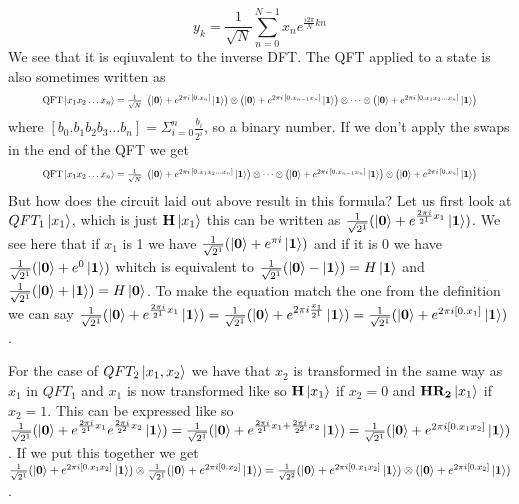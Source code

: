 $$y_{k}={\frac {1}{\sqrt {N}}}\sum _{n=0}^{N-1}x_{n}e^{{\frac {i2\pi }{N}}kn}$$
We see that it is eqiuvalent to the inverse DFT.
The QFT applied to a state is also sometimes written as 
\begin{equation*}
\resizebox{.9\hsize}{!}{${\text{QFT}}\ket{x_{1}x_{2}\ldots x_{n}} ={\frac {1}{\sqrt {N}}}\ \left(\ket{\qtz} +e^{2\pi i\,[0.x_{n}]}\ket{\qto} \right)\otimes \left(\ket{\qtz} +e^{2\pi i\,[0.x_{n-1}x_{n}]}\ket{\qto} \right)\otimes \cdots \otimes \left(\ket{\qtz} +e^{2\pi i\,[0.x_{1}x_{2}\ldots x_{n}]}\ket{\qto} \right)$}
\end{equation*}
where $[b_0.b_1b_2b_3...b_n]=\Sigma^{n}_{i=0}\frac{b_i}{2^i}$, so a binary number\cite{osd}. If we don't apply the swaps in the end of the QFT we get 
\begin{equation*}
    \resizebox{.9\hsize}{!}{${\text{QFT}}\ket{x_{1}x_{2}\ldots x_{n}}={\frac {1}{\sqrt {N}}}\ \left(\ket{\qtz} +e^{2\pi i\,[0.x_{1}x_{2}\ldots x_{n}]}\ket{\qto} \right)\otimes \cdots \otimes \left(\ket{\qtz} +e^{2\pi i\,[0.x_{n-1}x_{n}]}\ket{\qto} \right)\otimes \left(\ket{\qtz} +e^{2\pi i\,[0.x_{n}]}\ket{\qto} \right)$}
\end{equation*}
But how does the circuit laid out above result in this formula?
Let us first look at $QFT_1\ket{x_1}$, which is just $\mathbf{H}\ket{x_1}$ this can be written as $\frac{1}{\sqrt{2^1}}(\ket{\mathbf{0}}+e^{\frac{2\pi i}{2^1}x_1}\ket{\mathbf{1}})$.
We see here that if $x_1$ is 1 we have $\frac{1}{\sqrt{2^1}}(\ket{\mathbf{0}}+e^{\pi i}\ket{\mathbf{1}})$ and if it is 0 we have $\frac{1}{\sqrt{2^1}}(\ket{\mathbf{0}}+e^{0}\ket{\mathbf{1}})$ whitch is equivalent to $\frac{1}{\sqrt{2^1}}(\ket{\mathbf{0}}-\ket{\mathbf{1}})=H\ket{\mathbf{1}}$ and $\frac{1}{\sqrt{2^1}}(\ket{\mathbf{0}}+\ket{\mathbf{1}})=H\ket{\mathbf{0}}$. 
To make the equation match the one from the definition we can say $\frac{1}{\sqrt{2^1}}(\ket{\mathbf{0}}+e^{\frac{2\pi i}{2^1}x_1}\ket{\mathbf{1}})=\frac{1}{\sqrt{2^1}}(\ket{\mathbf{0}}+e^{2\pi i\frac{x_1}{2^1}}\ket{\mathbf{1}})=\frac{1}{\sqrt{2^1}}(\ket{\mathbf{0}}+e^{2\pi i[0.x_1]}\ket{\mathbf{1}})$. 


For the case of $QFT_2\ket{x_1,x_2}$ we have that $x_2$ is transformed in the same way as $x_1$ in $QFT_1$ and $x_1$ is now transformed like so $\mathbf{H}\ket{x_1}$ if $x_2=0$ and $\mathbf{H}\mathbf{R_{2}}\ket{x_1}$ if $x_2=1$. 
This can be expressed like so 
$\frac{1}{\sqrt{2^1}}(\ket{\mathbf{0}}+e^{\frac{2\pi i}{2^1}x_1}e^{\frac{2\pi i}{2^2}x_2}\ket{\mathbf{1}})= \frac{1}{\sqrt{2^1}}(\ket{\mathbf{0}}+e^{\frac{2\pi i}{2^1}x_1+\frac{2\pi i}{2^2}x_2}\ket{\mathbf{1}})=\frac{1}{\sqrt{2^1}}(\ket{\mathbf{0}}+e^{2\pi i[0.x_1x_2]}\ket{\mathbf{1}})$. 
If we put this together we get $\frac{1}{\sqrt{2^1}}(\ket{\mathbf{0}}+e^{2\pi i[0.x_1x_2]}\ket{\mathbf{1}})\otimes \frac{1}{\sqrt{2^1}}(\ket{\mathbf{0}}+e^{2\pi i[0.x_2]}\ket{\mathbf{1}})=\frac{1}{\sqrt{2^2}}(\ket{\mathbf{0}}+e^{2\pi i[0.x_1x_2]}\ket{\mathbf{1}})\otimes(\ket{\mathbf{0}}+e^{2\pi i[0.x_2]}\ket{\mathbf{1}})$. 

